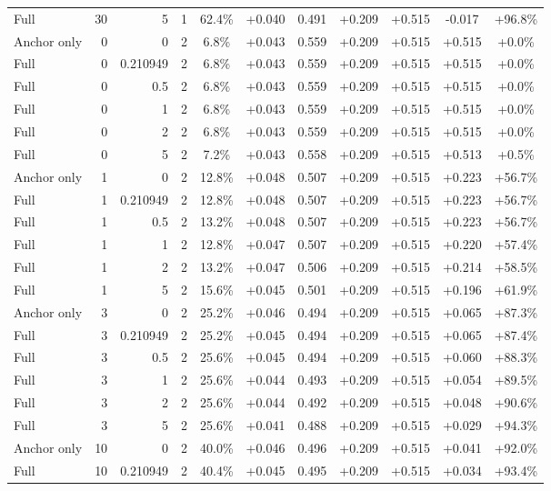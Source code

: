 \begin{table}[htbp]
\begin{tabular}{lrrrccccccc}
Full & 30 & 5 & 1 & 62.4\% & +0.040 & 0.491 & +0.209 & +0.515 & -0.017 & +96.8\% \\
Anchor only & 0 & 0 & 2 & 6.8\% & +0.043 & 0.559 & +0.209 & +0.515 & +0.515 & +0.0\% \\
Full & 0 & 0.210949 & 2 & 6.8\% & +0.043 & 0.559 & +0.209 & +0.515 & +0.515 & +0.0\% \\
Full & 0 & 0.5 & 2 & 6.8\% & +0.043 & 0.559 & +0.209 & +0.515 & +0.515 & +0.0\% \\
Full & 0 & 1 & 2 & 6.8\% & +0.043 & 0.559 & +0.209 & +0.515 & +0.515 & +0.0\% \\
Full & 0 & 2 & 2 & 6.8\% & +0.043 & 0.559 & +0.209 & +0.515 & +0.515 & +0.0\% \\
Full & 0 & 5 & 2 & 7.2\% & +0.043 & 0.558 & +0.209 & +0.515 & +0.513 & +0.5\% \\
Anchor only & 1 & 0 & 2 & 12.8\% & +0.048 & 0.507 & +0.209 & +0.515 & +0.223 & +56.7\% \\
Full & 1 & 0.210949 & 2 & 12.8\% & +0.048 & 0.507 & +0.209 & +0.515 & +0.223 & +56.7\% \\
Full & 1 & 0.5 & 2 & 13.2\% & +0.048 & 0.507 & +0.209 & +0.515 & +0.223 & +56.7\% \\
Full & 1 & 1 & 2 & 12.8\% & +0.047 & 0.507 & +0.209 & +0.515 & +0.220 & +57.4\% \\
Full & 1 & 2 & 2 & 13.2\% & +0.047 & 0.506 & +0.209 & +0.515 & +0.214 & +58.5\% \\
Full & 1 & 5 & 2 & 15.6\% & +0.045 & 0.501 & +0.209 & +0.515 & +0.196 & +61.9\% \\
Anchor only & 3 & 0 & 2 & 25.2\% & +0.046 & 0.494 & +0.209 & +0.515 & +0.065 & +87.3\% \\
Full & 3 & 0.210949 & 2 & 25.2\% & +0.045 & 0.494 & +0.209 & +0.515 & +0.065 & +87.4\% \\
Full & 3 & 0.5 & 2 & 25.6\% & +0.045 & 0.494 & +0.209 & +0.515 & +0.060 & +88.3\% \\
Full & 3 & 1 & 2 & 25.6\% & +0.044 & 0.493 & +0.209 & +0.515 & +0.054 & +89.5\% \\
Full & 3 & 2 & 2 & 25.6\% & +0.044 & 0.492 & +0.209 & +0.515 & +0.048 & +90.6\% \\
Full & 3 & 5 & 2 & 25.6\% & +0.041 & 0.488 & +0.209 & +0.515 & +0.029 & +94.3\% \\
Anchor only & 10 & 0 & 2 & 40.0\% & +0.046 & 0.496 & +0.209 & +0.515 & +0.041 & +92.0\% \\
Full & 10 & 0.210949 & 2 & 40.4\% & +0.045 & 0.495 & +0.209 & +0.515 & +0.034 & +93.4\% \\

\end{tabular}
\end{table}
